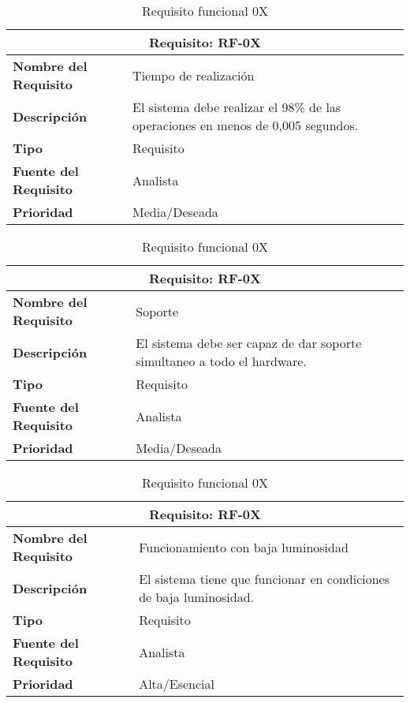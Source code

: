 \begin{table}[H]
\begin{center}
\begin{tabular}{p{} p{7cm}}
\multicolumn{2}{c}{\textbf{Requisito: RF-0X} } \\
\hline \hline
\textbf{Nombre del Requisito} & Tiempo de realización\\
\hline
\textbf{Descripción} &  El sistema debe realizar el 98\% de las operaciones en menos de 0,005 segundos.\\
\hline
\textbf{Tipo} & Requisito  \\
\hline
\textbf{Fuente del Requisito} & Analista  \\
\hline
\textbf{Prioridad} & Media/Deseada \\ \hline
\end{tabular}
\caption{Requisito funcional 0X}
\label{tab:personal}
\end{center}
\end{table}

\begin{table}[H]
\begin{center}
\begin{tabular}{p{} p{7cm}}
\multicolumn{2}{c}{\textbf{Requisito: RF-0X} } \\
\hline \hline
\textbf{Nombre del Requisito} & Soporte\\
\hline
\textbf{Descripción} & El sistema debe ser capaz de dar soporte simultaneo a todo el hardware.\\
\hline
\textbf{Tipo} & Requisito  \\
\hline
\textbf{Fuente del Requisito} & Analista  \\
\hline
\textbf{Prioridad} & Media/Deseada \\ \hline
\end{tabular}
\caption{Requisito funcional 0X}
\label{tab:personal}
\end{center}
\end{table}

\begin{table}[H]
\begin{center}
\begin{tabular}{p{} p{7cm}}
\multicolumn{2}{c}{\textbf{Requisito: RF-0X} } \\
\hline \hline
\textbf{Nombre del Requisito} & Funcionamiento con baja luminosidad\\
\hline
\textbf{Descripción} & El sistema tiene que funcionar en condiciones de baja luminosidad.\\
\hline
\textbf{Tipo} & Requisito  \\
\hline
\textbf{Fuente del Requisito} & Analista  \\
\hline
\textbf{Prioridad} & Alta/Esencial \\ \hline
\end{tabular}
\caption{Requisito funcional 0X}
\label{tab:personal}
\end{center}
\end{table}

